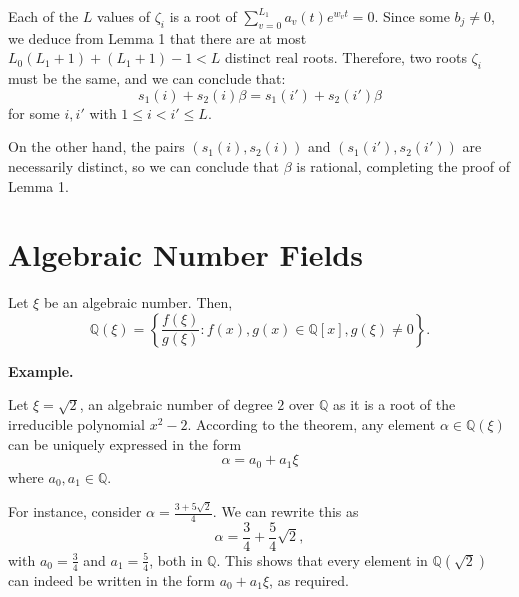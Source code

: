 \documentclass{article}
\newenvironment{proofbox}
  {\begin{mdframed}[linewidth=1pt,linecolor=black,backgroundcolor=white]\noindent\ignorespaces}
  {\end{mdframed}}
\newenvironment{example}{%
    \par
    \vspace{5pt}
	\begin{minipage}{\textwidth}
		\noindent\textbf{Example.}
		\tcolorbox[blanker,breakable,left=5mm,parbox=false,
	    before upper={\parindent15pt},
	    after skip=10pt,
		borderline west={1mm}{0pt}{cyan!10!white}]
}{%
		\endtcolorbox
	\end{minipage}
    \vspace{5pt}
}
\begin{document}
\begin{proofbox}
Each of the $L$ values of $\zeta_i$ is a root of $\sum_{v=0}^{L_1} a_v(t) e^{w_v t} = 0$. Since some $b_j \neq 0$, we deduce from Lemma 1 that there are at most $L_0(L_1 + 1) + (L_1 + 1) - 1 < L$ distinct real roots. Therefore, two roots $\zeta_i$ must be the same, and we can conclude that:
\[
s_1(i) + s_2(i) \beta = s_1(i') + s_2(i') \beta
\]
for some $i, i'$ with $1 \leq i < i' \leq L$.

On the other hand, the pairs $(s_1(i), s_2(i))$ and $(s_1(i'), s_2(i'))$ are necessarily distinct, so we can conclude that $\beta$ is rational, completing the proof of Lemma 1.

\end{proofbox}
\section{Algebraic Number Fields}

Let $\xi$ be an algebraic number. Then,
\[
\mathbb{Q}(\xi) = \left\{ \frac{f(\xi)}{g(\xi)} : f(x), g(x) \in \mathbb{Q}[x], g(\xi) \neq 0 \right\}.
\]


\begin{example}
    Let \(\xi = \sqrt{2}\), an algebraic number of degree \(2\) over \(\mathbb{Q}\) as it is a root of the irreducible polynomial \(x^2 - 2\). According to the theorem, any element \(\alpha \in \mathbb{Q}(\xi)\) can be uniquely expressed in the form
    \[
    \alpha = a_0 + a_1 \xi
    \]
    where \(a_0, a_1 \in \mathbb{Q}\).

    For instance, consider \(\alpha = \frac{3 + 5\sqrt{2}}{4}\). We can rewrite this as
    \[
    \alpha = \frac{3}{4} + \frac{5}{4}\sqrt{2},
    \]
    with \(a_0 = \frac{3}{4}\) and \(a_1 = \frac{5}{4}\), both in \(\mathbb{Q}\). This shows that every element in \(\mathbb{Q}(\sqrt{2})\) can indeed be written in the form \(a_0 + a_1 \xi\), as required.
\end{example}
\end{document}
